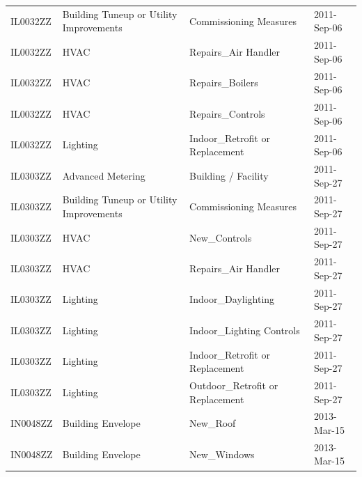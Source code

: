 \documentclass[12pt]{article}
\begin{document}
\begin{longtable}{lp{4cm}p{4cm}p{3cm}}
IL0032ZZ         & Building Tuneup or Utility Improvements & Commissioning Measures                    & 2011-Sep-06                   \\
IL0032ZZ         & HVAC                                    & Repairs\_Air Handler                      & 2011-Sep-06                   \\
IL0032ZZ         & HVAC                                    & Repairs\_Boilers                          & 2011-Sep-06                   \\
IL0032ZZ         & HVAC                                    & Repairs\_Controls                         & 2011-Sep-06                   \\
IL0032ZZ         & Lighting                                & Indoor\_Retrofit or Replacement           & 2011-Sep-06                   \\
IL0303ZZ         & Advanced Metering                       & Building / Facility                       & 2011-Sep-27                   \\
IL0303ZZ         & Building Tuneup or Utility Improvements & Commissioning Measures                    & 2011-Sep-27                   \\
IL0303ZZ         & HVAC                                    & New\_Controls                             & 2011-Sep-27                   \\
IL0303ZZ         & HVAC                                    & Repairs\_Air Handler                      & 2011-Sep-27                   \\
IL0303ZZ         & Lighting                                & Indoor\_Daylighting                       & 2011-Sep-27                   \\
IL0303ZZ         & Lighting                                & Indoor\_Lighting Controls                 & 2011-Sep-27                   \\
IL0303ZZ         & Lighting                                & Indoor\_Retrofit or Replacement           & 2011-Sep-27                   \\
IL0303ZZ         & Lighting                                & Outdoor\_Retrofit or Replacement          & 2011-Sep-27                   \\
IN0048ZZ         & Building Envelope                       & New\_Roof                                 & 2013-Mar-15                   \\
IN0048ZZ         & Building Envelope                       & New\_Windows                              & 2013-Mar-15                   \\

\end{longtable}
\end{document}
